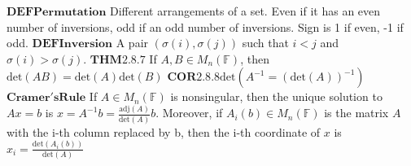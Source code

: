 \documentclass[8pt]{extarticle}
\theoremstyle{definition}
\begin{document}
{$\mathbf{DEF Permutation}$ Different arrangements of a set. Even if it has an even number of inversions, odd if an odd number of inversions. Sign is 1 if even, -1 if odd.
$\mathbf{DEF Inversion}$ A pair $(\sigma(i), \sigma(j))$ such that $i<j$ and $\sigma(i) > \sigma(j)$.
$\mathbf{THM2.8.7}$ If $A, B \in M_n(\mathbb{F})$, then $\text{det}(AB) = \text{det}(A)\text{det}(B)$
$\mathbf{COR2.8.8} \text{det}(A^{-1} = (\text{det}(A))^{-1})$
$\mathbf{Cramer's Rule}$ If $A \in M_n(\mathbb{F})$ is nonsingular, then the unique solution to $Ax=b$ is $x = A^{-1}b = \frac{\text{adj}(A)}{\text{det}(A)}b$. Moreover, if $A_i(b) \in M_n(\mathbb{F})$ is the matrix $A$ with the i-th column replaced by b, then the i-th coordinate of $x$ is $x_i = \frac{\text{det}(A_i(b))}{\text{det}(A)}$

}
\end{document}
